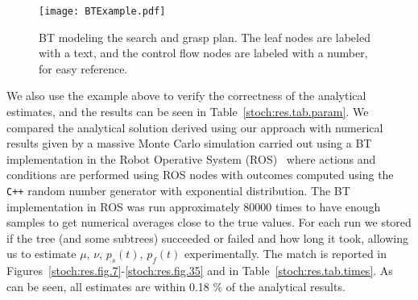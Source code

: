 \begin{figure}[h]
\centering
\texttt{[image: BTExample.pdf]}
\caption{BT modeling the search and grasp plan. The leaf nodes are labeled with a text, and the control flow nodes are labeled with a number, 
for easy reference.}
\label{stoch:res.fig.BT}
\end{figure}


We also use the example above to verify the correctness of the analytical estimates, and the results  can be seen in Table~\ref{stoch:res.tab.param}.
We compared the analytical solution derived using our approach with  numerical results given by a massive Monte Carlo simulation carried out using a BT implementation in the Robot Operative System (ROS)~\cite{Marzinotto14} where actions and conditions are performed using ROS nodes with outcomes computed using the \verb!C++! 
random number generator with exponential distribution. The BT implementation in ROS was run approximately 80000 times to have enough samples to get numerical averages close to the true values.
For each run we stored if the tree (and some subtrees) succeeded or failed and how long it took, allowing us to estimate $\mu$, $\nu$, $p_s(t)$, $p_f(t)$ experimentally. The match is reported in Figures~\ref{stoch:res.fig.7}-\ref{stoch:res.fig.35} and in Table~\ref{stoch:res.tab.times}. 
As can be seen, all estimates are within  0.18 \% of the analytical results.



